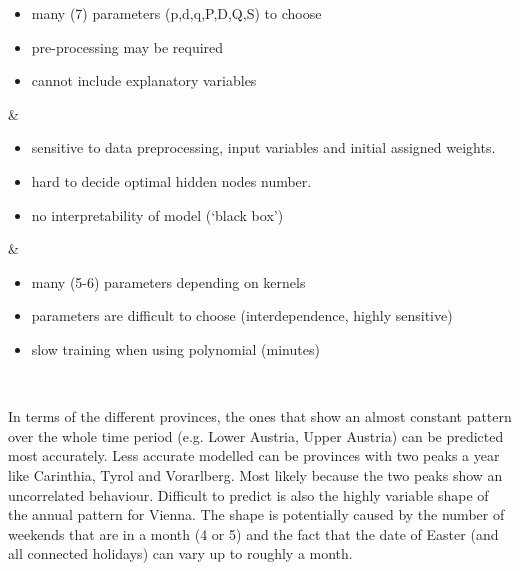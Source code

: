 \documentclass[a4paper,reqno,]{article}
\begin{document}
\begin{longtable}[h!]
\begin{itemize}[label={--},noitemsep,leftmargin=*,topsep=10pt,partopsep=0pt]
\item many (7) parameters (p,d,q,P,D,Q,S) to choose 
\item pre-processing may be required
\item cannot include explanatory variables
\end{itemize} & \begin{itemize}[label={--},noitemsep,leftmargin=*,topsep=10pt,partopsep=0pt]
\item sensitive to data preprocessing, input variables and initial assigned weights. 
\item hard to decide optimal hidden nodes number.
\item no interpretability of model (‘black box’)
\end{itemize} & \begin{itemize}[label={--},noitemsep,leftmargin=*,topsep=10pt,partopsep=0pt]
\item many (5-6) parameters depending on kernels 
\item parameters are difficult to choose (interdependence, highly sensitive)
\item slow training when using polynomial (minutes)
\end{itemize}   \\ 
\specialrule{0.05cm}{.0cm}{.0cm}
\end{longtable}
\noindent
In terms of the different provinces, the ones that show an almost constant pattern over the whole time period (e.g. Lower Austria, Upper Austria) can be predicted most accurately. Less accurate modelled can be provinces with two peaks a year like Carinthia, Tyrol and Vorarlberg. Most likely because the two peaks show an uncorrelated behaviour. Difficult to predict is also the highly variable shape of the annual pattern for Vienna. The shape is potentially caused by the number of weekends that are in a month (4 or 5) and the fact that the date of Easter (and all connected holidays) can vary up to roughly a month.
\\
\\
\end{document}

